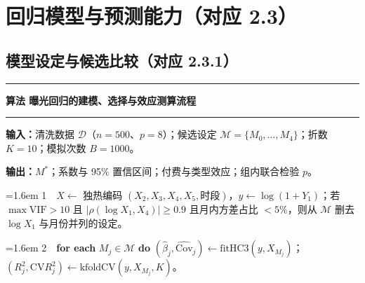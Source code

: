 \section{回归模型与预测能力（对应 2.3）}

\subsection{模型设定与候选比较（对应 2.3.1）}

\begin{center}
\begin{minipage}{\textwidth}
\noindent\rule{\textwidth}{0.9pt}\par\nobreak\vspace{2pt}
\noindent\textbf{算法 \thealgocnt\quad 曝光回归的建模、选择与效应测算流程}\label{alg:pipeline}\par\nobreak\vspace{2pt}
\noindent\rule{\textwidth}{0.4pt}\par\nobreak\vspace{4pt}
{\small
\noindent\textbf{输入：}清洗数据 $\mathcal{D}$（$n=500$、$p=8$）；候选设定 $\mathcal{M}=\{M_0,\dots,M_4\}$；折数 $K=10$；模拟次数 $B=1000$。\par\vspace{2pt}
\noindent\textbf{输出：}$M^{*}$；系数与 95\% 置信区间；付费与类型效应；组内联合检验 $p$。\par\vspace{4pt}
\par
\hangindent=1.6em \hspace*{1.2em}1\ \ $X\leftarrow$ 独热编码 $(X_2,X_3,X_4,X_5,\text{时段})$，$y\leftarrow\log(1+Y_1)$；若 $\max\mathrm{VIF}>10$ 且 $|\rho(\log X_1,X_4)|\ge0.9$ 且月内方差占比 $<5\%$，则从 $\mathcal{M}$ 删去 $\log X_1$ 与月份并列的设定。\par\vspace{3pt}
\par
\hangindent=1.6em \hspace*{1.2em}2\ \ \textbf{for each} $M_j\in\mathcal{M}$ \textbf{do} $(\hat\beta_j,\widehat{\mathrm{Cov}}_j)\leftarrow\mathrm{fitHC3}(y,X_{M_j})$；$(R^2_j,\mathrm{CV}R^2_j)\leftarrow\mathrm{kfoldCV}(y,X_{M_j},K)$。\par\vspace{3pt}
}
\end{minipage}
\end{center}
